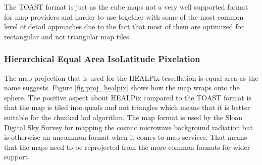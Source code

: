 The TOAST format is just as the cube maps not a very well supported format for map providers and harder to use together with some of the most common level of detail approaches due to the fact that most of them are optimized for rectangular and not triangular map tiles.

\subsubsection{Hierarchical Equal Area IsoLatitude Pixelation}

The map projection that is used for the HEALPix tessellation is equal-area as the name suggests. Figure \ref{fig:proj_healpix} shows how the map wraps onto the sphere. The positive aspect about HEALPix compared to the TOAST format is that the map is tiled into quads and not triangles which means that it is better suitable for the chunked lod \cite{cozzi11} algorithm. The map format is used by the Sloan Digital Sky Survey for mapping the cosmic microwave background radiation but is otherwise an uncommon format when it comes to map services. That means that the maps need to be reprojected from the more common formats for wider support.

